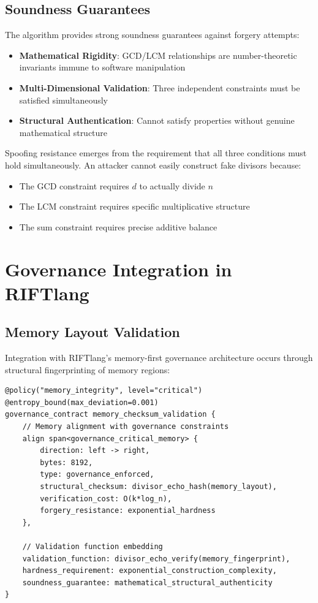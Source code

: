 \documentclass[11pt,letterpaper]{article}
\begin{document}
\subsection{Soundness Guarantees}

The algorithm provides strong soundness guarantees against forgery attempts:

\begin{itemize}
\item \textbf{Mathematical Rigidity}: GCD/LCM relationships are number-theoretic invariants immune to software manipulation
\item \textbf{Multi-Dimensional Validation}: Three independent constraints must be satisfied simultaneously
\item \textbf{Structural Authentication}: Cannot satisfy properties without genuine mathematical structure
\end{itemize}

Spoofing resistance emerges from the requirement that all three conditions must hold simultaneously. An attacker cannot easily construct fake divisors because:
\begin{itemize}
\item The GCD constraint requires $d$ to actually divide $n$
\item The LCM constraint requires specific multiplicative structure
\item The sum constraint requires precise additive balance
\end{itemize}

\section{Governance Integration in RIFTlang}

\subsection{Memory Layout Validation}

Integration with RIFTlang's memory-first governance architecture occurs through structural fingerprinting of memory regions:

\begin{lstlisting}[language=rift, caption=Memory Region Integrity Validation]
@policy("memory_integrity", level="critical")
@entropy_bound(max_deviation=0.001)
governance_contract memory_checksum_validation {
    // Memory alignment with governance constraints
    align span<governance_critical_memory> {
        direction: left -> right,
        bytes: 8192,
        type: governance_enforced,
        structural_checksum: divisor_echo_hash(memory_layout),
        verification_cost: O(k*log_n),
        forgery_resistance: exponential_hardness
    },
    
    // Validation function embedding
    validation_function: divisor_echo_verify(memory_fingerprint),
    hardness_requirement: exponential_construction_complexity,
    soundness_guarantee: mathematical_structural_authenticity
}
\end{lstlisting}
\end{document}
